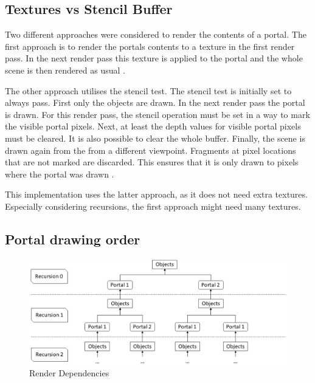 \subsection{Textures vs Stencil Buffer}
\label{section:textursVsStencil}
Two different approaches were considered to render the contents of a portal. The first approach is to render the portals contents to a texture in the first render pass. In the next render pass this texture is applied to the portal and the whole scene is then rendered as usual \cite{schmalstieg:1999:sewing, lecture:portalProblems}.

The other approach utilises the stencil test. The stencil test is initially set to always pass. First only the objects are drawn. In the next render pass the portal is drawn. For this render pass, the stencil operation must be set in a way to mark the visible portal pixels. Next, at least the depth values for visible portal pixels must be cleared. It is also possible to clear the whole buffer. Finally, the scene is drawn again from the from a different viewpoint. Fragments at pixel locations that are not marked are discarded. This ensures that it is only drawn to pixels where the portal was drawn \cites{schmalstieg:1999:sewing, lowe:2005:technique, lecture:portalProblems}.


This implementation uses the latter approach, as it does not need extra textures. Especially considering recursions, the first approach might need many textures. 

\subsection{Portal drawing order}

\begin{figure}[h]
	\includegraphics[width=\linewidth]{images/rendertree.png}
	\caption{Render Dependencies}
	\label{fig:rendertree}
\end{figure}


